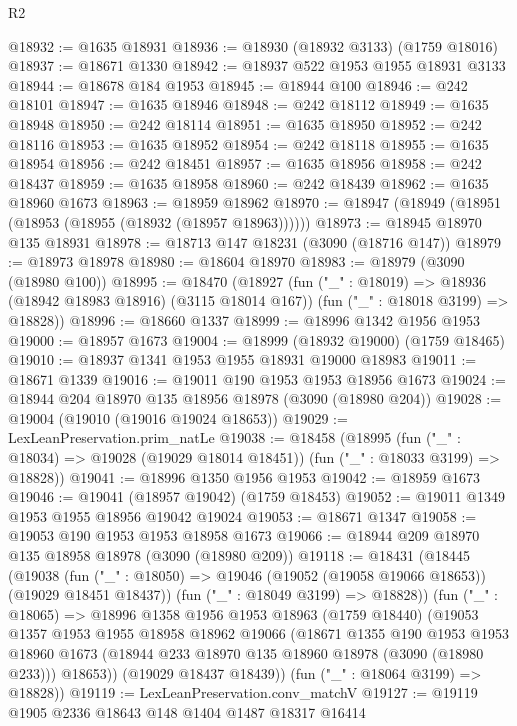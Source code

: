 \begin{lexlean}{R2}
\begin{coremodule}
@18932 := @1635 @18931
@18936 := @18930 (@18932 @3133) (@1759 @18016)
@18937 := @18671 @1330
@18942 := @18937 @522 @1953 @1955 @18931 @3133
@18944 := @18678 @184 @1953
@18945 := @18944 @100
@18946 := @242 @18101
@18947 := @1635 @18946
@18948 := @242 @18112
@18949 := @1635 @18948
@18950 := @242 @18114
@18951 := @1635 @18950
@18952 := @242 @18116
@18953 := @1635 @18952
@18954 := @242 @18118
@18955 := @1635 @18954
@18956 := @242 @18451
@18957 := @1635 @18956
@18958 := @242 @18437
@18959 := @1635 @18958
@18960 := @242 @18439
@18962 := @1635 @18960 @1673
@18963 := @18959 @18962
@18970 := @18947 (@18949 (@18951 (@18953 (@18955 (@18932 (@18957 @18963))))))
@18973 := @18945 @18970 @135 @18931
@18978 := @18713 @147 @18231 (@3090 (@18716 @147))
@18979 := @18973 @18978
@18980 := @18604 @18970
@18983 := @18979 (@3090 (@18980 @100))
@18995 := @18470
    (@18927
      (fun ("_" : @18019) => @18936 (@18942 @18983 @18916) (@3115 @18014 @167))
      (fun ("_" : @18018 @3199) => @18828))
@18996 := @18660 @1337
@18999 := @18996 @1342 @1956 @1953
@19000 := @18957 @1673
@19004 := @18999 (@18932 @19000) (@1759 @18465)
@19010 := @18937 @1341 @1953 @1955 @18931 @19000 @18983
@19011 := @18671 @1339
@19016 := @19011 @190 @1953 @1953 @18956 @1673
@19024 := @18944 @204 @18970 @135 @18956 @18978 (@3090 (@18980 @204))
@19028 := @19004 (@19010 (@19016 @19024 @18653))
@19029 := LexLeanPreservation.prim_natLe
@19038 := @18458
    (@18995
      (fun ("_" : @18034) => @19028 (@19029 @18014 @18451))
      (fun ("_" : @18033 @3199) => @18828))
@19041 := @18996 @1350 @1956 @1953
@19042 := @18959 @1673
@19046 := @19041 (@18957 @19042) (@1759 @18453)
@19052 := @19011 @1349 @1953 @1955 @18956 @19042 @19024
@19053 := @18671 @1347
@19058 := @19053 @190 @1953 @1953 @18958 @1673
@19066 := @18944 @209 @18970 @135 @18958 @18978 (@3090 (@18980 @209))
@19118 := @18431
    (@18445
      (@19038
        (fun ("_" : @18050) => @19046 (@19052 (@19058 @19066 @18653)) (@19029 @18451 @18437))
        (fun ("_" : @18049 @3199) => @18828))
      (fun ("_" : @18065) =>
      @18996
        @1358
        @1956
        @1953
        @18963
        (@1759 @18440)
        (@19053
          @1357
          @1953
          @1955
          @18958
          @18962
          @19066
          (@18671
            @1355
            @190
            @1953
            @1953
            @18960
            @1673
            (@18944 @233 @18970 @135 @18960 @18978 (@3090 (@18980 @233)))
            @18653))
        (@19029 @18437 @18439))
      (fun ("_" : @18064 @3199) => @18828))
@19119 := LexLeanPreservation.conv_matchV
@19127 := @19119 @1905 @2336 @18643 @148 @1404 @1487 @18317 @16414

\end{coremodule}
\end{lexlean}
